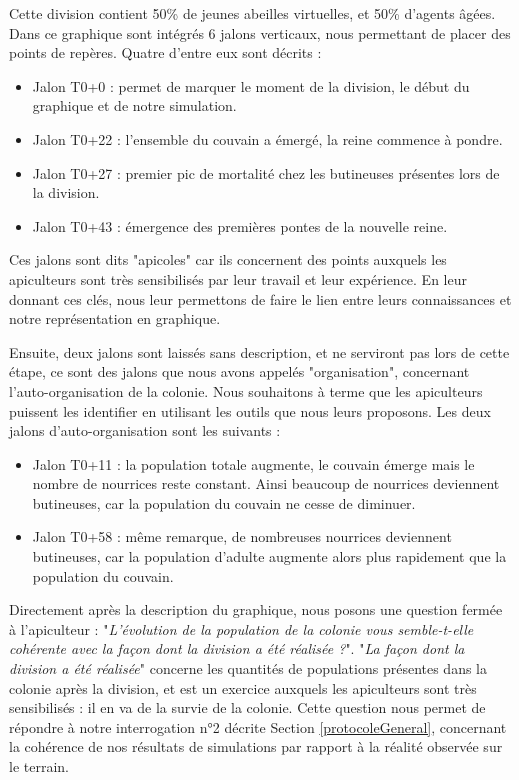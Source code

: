 		Cette division contient 50\% de jeunes abeilles virtuelles, et 50\% d'agents âgées. Dans ce graphique sont intégrés 6 jalons verticaux, nous permettant de placer des points de repères. Quatre d'entre eux sont décrits :
		\begin{itemize}
			\item Jalon T0+0 : permet de marquer le moment de la division, le début du graphique et de notre simulation.
			\item Jalon T0+22 : l'ensemble du couvain a émergé, la reine commence à pondre.
			\item Jalon T0+27 : premier pic de mortalité chez les butineuses présentes lors de la division.
			\item Jalon T0+43 : émergence des premières pontes de la nouvelle reine.
		\end{itemize}
		Ces jalons sont dits "apicoles" car ils concernent des points auxquels les apiculteurs sont très sensibilisés par leur travail et leur expérience. En leur donnant ces clés, nous leur permettons de faire le lien entre leurs connaissances et notre représentation en graphique.
		
		Ensuite, deux jalons sont laissés sans description, et ne serviront pas lors de cette étape, ce sont des jalons que nous avons appelés "organisation", concernant l'auto-organisation de la colonie. Nous souhaitons à terme que les apiculteurs puissent les identifier en utilisant les outils que nous leurs proposons. Les deux jalons d'auto-organisation sont les suivants :
		\begin{itemize}
			\item Jalon T0+11 : la population totale augmente, le couvain émerge mais le nombre de nourrices reste constant. Ainsi beaucoup de nourrices deviennent butineuses, car la population du couvain ne cesse de diminuer.
			\item Jalon T0+58 : même remarque, de nombreuses nourrices deviennent butineuses, car la population d'adulte augmente alors plus rapidement que la population du couvain.
		\end{itemize}
		
		Directement après la description du graphique, nous posons une question fermée à l'apiculteur : "\textit{L'évolution de la population de la colonie vous semble-t-elle cohérente avec la façon dont la division a été réalisée ?}". "\textit{La façon dont la division a été réalisée}" concerne les quantités de populations présentes dans la colonie après la division, et est un exercice auxquels les apiculteurs sont très sensibilisés : il en va de la survie de la colonie. Cette question nous permet de répondre à notre interrogation n°2 décrite Section \ref{protocoleGeneral}, concernant la cohérence de nos résultats de simulations par rapport à la réalité observée sur le terrain.
		
